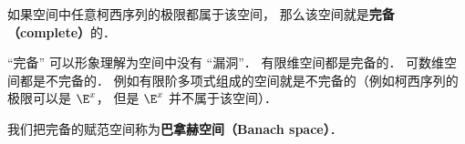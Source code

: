 

如果空间中任意柯西序列的极限都属于该空间， 那么该空间就是\textbf{完备（complete）}的．

“完备” 可以形象理解为空间中没有 “漏洞”． 有限维空间都是完备的． 可数维空间都是不完备的． 例如有限阶多项式组成的空间就是不完备的（例如柯西序列的极限可以是 $\E^x$， 但是 $\E^x$ 并不属于该空间）．

我们把完备的赋范空间称为\textbf{巴拿赫空间（Banach space）}．
